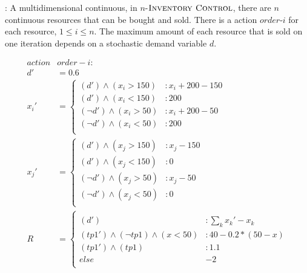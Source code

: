 \Invent:
A multidimensional continuous, in $n$-$\textsc{Inventory Control}$, there are $n$ continuous resources that can be bought and sold. There is a action $order$-$i$ for each resource, $ 1 \leq i \leq n$. The maximum amount of  each resource that is sold on one iteration depends on a stochastic demand variable $d$. 

{\footnotesize
\begin{align*}
action &  order-i:\\
d' &= 0.6\\
x_i' & = \begin{cases} 
(d') \wedge (x_i > 150) &: x_i + 200 - 150\\
(d') \wedge (x_i < 150) &:  200\\
(\neg d') \wedge (x_i > 50) &: x_i + 200 - 50\\
(\neg d') \wedge (x_i < 50) &:  200\\
\end{cases} \\
x_j' & = \begin{cases} 
(d') \wedge (x_j > 150) &: x_j - 150\\
(d') \wedge (x_j < 150) &:  0\\
(\neg d') \wedge (x_j > 50) &: x_j - 50\\
(\neg d') \wedge (x_j < 50) &:  0\\
\end{cases} \\
R & = \begin{cases} \\
(d') &: \sum_{k} {x_k' - x_k}\\
(tp1') \wedge (\neg tp1) \wedge (x < 50) &: 40 - 0.2*(50-x)\\
(tp1') \wedge ( tp1) &:  1.1\\
else & -2\\
\end{cases} 
\end{align*} }


